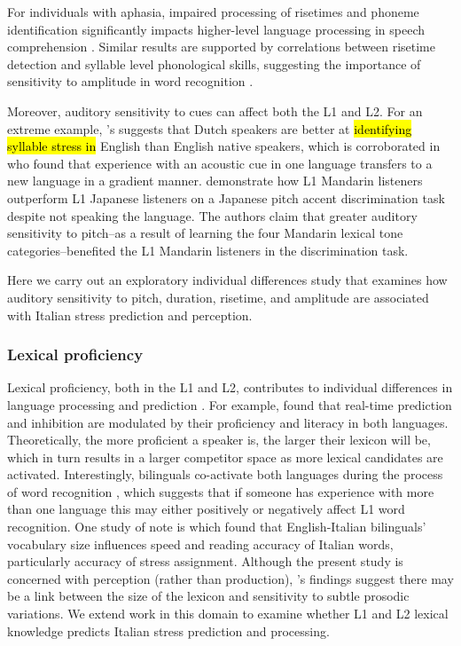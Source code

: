 For individuals with aphasia, impaired processing of risetimes and phoneme identification significantly impacts higher-level language processing in speech comprehension \citep{Kries2023}. Similar results are supported by correlations between risetime detection and syllable level phonological skills, suggesting the importance of sensitivity to amplitude in word recognition \citep{Hamalaine2005}. 

Moreover, auditory sensitivity to cues can affect both the L1 and L2. For an extreme example, \cite{cutler2007dutch}'s suggests that Dutch speakers are better at \hl{identifying syllable stress in} English than English native speakers, which is corroborated in \cite{Pajak2014} who found that experience with an acoustic cue in one language transfers to a new language in a gradient manner. \cite{wienergoss} demonstrate how L1 Mandarin listeners outperform L1 Japanese listeners on a Japanese pitch accent discrimination task despite not speaking the language. The authors claim that greater auditory sensitivity to pitch--as a result of learning the four Mandarin lexical tone categories--benefited the L1 Mandarin listeners in the discrimination task. 

Here we carry out an exploratory individual differences study that examines how auditory sensitivity to pitch, duration, risetime, and amplitude are associated with Italian stress prediction and perception.

\subsubsection{Lexical proficiency}
Lexical proficiency, both in the L1 and L2, contributes to individual differences in language processing and prediction \citep{Diependaele2013, Yap2012}. For example, \citep{Kukona2016} found that real-time prediction and inhibition are modulated by their proficiency and literacy in both languages. Theoretically, the more proficient a speaker is, the larger their lexicon will be, which in turn results in a larger competitor space as more lexical candidates are activated. Interestingly, bilinguals co-activate both languages during the process of word recognition \citep{kroll1997lexical, dijkstra2002architecture, marian2003competing}, which suggests that if someone has experience with more than one language this may either positively or negatively affect L1 word recognition. One study of note is \cite{primativo2013bilingual} which found that English-Italian bilinguals' vocabulary size influences speed and reading accuracy of Italian words, particularly accuracy of stress assignment. Although the present study is concerned with perception (rather than production), \cite{primativo2013bilingual}'s findings suggest there may be a link between the size of the lexicon and sensitivity to subtle prosodic variations. We extend work in this domain to examine whether L1 and L2 lexical knowledge predicts Italian stress prediction and processing.

